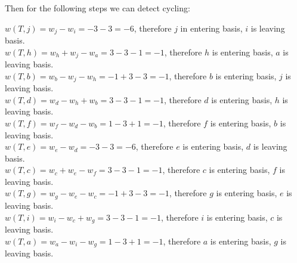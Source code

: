 				Then for the following steps we can detect cycling:

				$w(T, j) = w_j - w_i = -3 -3 = -6$, therefore $j$ in entering basis, $i$ is leaving basis.\\
				$w(T, h) = w_h + w_j - w_a = 3-3-1=-1$, therefore $h$ is entering basis, $a$ is leaving basis.\\
				$w(T, b) = w_b - w_j - w_h = -1 + 3 - 3 = -1$, therefore $b$ is entering basis, $j$ is leaving basis.\\
				$w(T, d) = w_d - w_h + w_b = 3 - 3 - 1 = -1$, therefore $d$ is entering basis, $h$ is leaving basis.\\
				$w(T, f) = w_f - w_d - w_b = 1 - 3 + 1 = -1$, therefore $f$ is entering basis, $b$ is leaving basis.\\
				$w(T, e) = w_e - w_d = -3 -3 = -6$, therefore $e$ is entering basis, $d$ is leaving basis.\\
				$w(T,c) = w_c + w_e - w_f = 3 -3 - 1 = -1$, therefore $c$ is entering basis, $f$ is leaving basis.\\
				$w(T,g) = w_g - w_e - w_c = -1 + 3 - 3 = -1$, therefore $g$ is entering basis, $e$ is leaving basis.\\
				$w(T,i) = w_i - w_c + w_g =3 - 3 - 1= -1 $, therefore $i$ is entering basis, $c$ is leaving basis.\\
				$w(T,a) = w_a - w_i - w_g = 1 - 3 + 1 = -1$, therefore $a$ is entering basis, $g$ is leaving basis.\\

